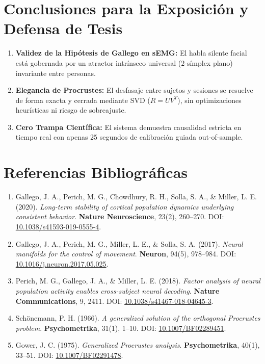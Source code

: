 \documentclass[11pt,a4paper,openany]{book}
\theoremstyle{definition}
\begin{document}
\section{Conclusiones para la Exposición y Defensa de Tesis}
\label{sec:conclusiones}

\begin{enumerate}
    \item \textbf{Validez de la Hipótesis de Gallego en sEMG:} El habla silente facial está gobernada por un atractor intrínseco universal ($2$-símplex plano) invariante entre personas.
    \item \textbf{Elegancia de Procrustes:} El desfasaje entre sujetos y sesiones se resuelve de forma exacta y cerrada mediante SVD ($R = U V^T$), sin optimizaciones heurísticas ni riesgo de sobreajuste.
    \item \textbf{Cero Trampa Científica:} El sistema demuestra causalidad estricta en tiempo real con apenas 25 segundos de calibración guiada out-of-sample.
\end{enumerate}

\section{Referencias Bibliográficas}
\label{sec:referencias}

\begin{enumerate}
    \item Gallego, J. A., Perich, M. G., Chowdhury, R. H., Solla, S. A., \& Miller, L. E. (2020). \textit{Long-term stability of cortical population dynamics underlying consistent behavior}. \textbf{Nature Neuroscience}, 23(2), 260--270. DOI: \href{https://doi.org/10.1038/s41593-019-0555-4}{10.1038/s41593-019-0555-4}.
    \item Gallego, J. A., Perich, M. G., Miller, L. E., \& Solla, S. A. (2017). \textit{Neural manifolds for the control of movement}. \textbf{Neuron}, 94(5), 978--984. DOI: \href{https://doi.org/10.1016/j.neuron.2017.05.025}{10.1016/j.neuron.2017.05.025}.
    \item Perich, M. G., Gallego, J. A., \& Miller, L. E. (2018). \textit{Factor analysis of neural population activity enables cross-subject neural decoding}. \textbf{Nature Communications}, 9, 2411. DOI: \href{https://doi.org/10.1038/s41467-018-04645-3}{10.1038/s41467-018-04645-3}.
    \item Schönemann, P. H. (1966). \textit{A generalized solution of the orthogonal Procrustes problem}. \textbf{Psychometrika}, 31(1), 1--10. DOI: \href{https://doi.org/10.1007/BF02289451}{10.1007/BF02289451}.
    \item Gower, J. C. (1975). \textit{Generalized Procrustes analysis}. \textbf{Psychometrika}, 40(1), 33--51. DOI: \href{https://doi.org/10.1007/BF02291478}{10.1007/BF02291478}.
\end{enumerate}


\end{document}
